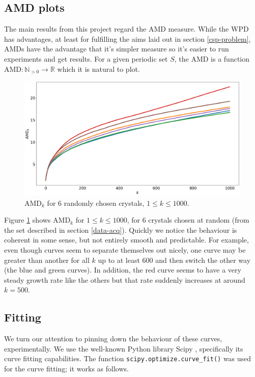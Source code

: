 \documentclass[11pt]{article}
\theoremstyle{definition}
\begin{document}
\subsection{AMD plots}

The main results from this project regard the AMD measure. While the WPD has advantages, at least for fulfilling the aims laid out in section \ref{csp-problem}, AMDs have the advantage that it's simpler measure so it's easier to run experiments and get results. For a given periodic set $S$, the AMD is a function AMD$:\mathbb{N}_{> 0} \rightarrow \mathbb{R}$ which it is natural to plot. 

\begin{figure}[h]
\centering
\includegraphics[scale=0.28]{amds2.png}
\caption{AMD$_k$ for 6 randomly chosen crystals, $1\leq k\leq 1000$.}
\label{fig:amd-curves}
\end{figure}

Figure \ref{fig:amd-curves} shows AMD$_k$ for $1\leq k \leq 1000$, for $6$ crystals chosen at random (from the set described in section \ref{data-acq}). Quickly we notice the behaviour is coherent in some sense, but not entirely smooth and predictable. For example, even though curves seem to separate themselves out nicely, one curve may be greater than another for all $k$ up to at least $600$ and then switch the other way (the blue and green curves). In addition, the red curve seems to have a very steady growth rate like the others but that rate suddenly increases at around $k=500$.

\subsection{Fitting}

We turn our attention to pinning down the behaviour of these curves, experimentally. We use the  well-known Python library Scipy \cite{2020SciPy-NMeth}, specifically its curve fitting capabilities. The function \texttt{scipy.optimize.curve\_fit()} was used for the curve fitting; it works as follows.
\end{document}
